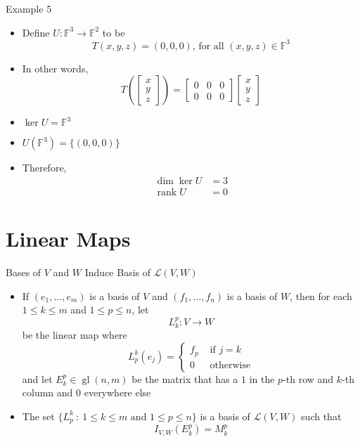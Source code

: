 \documentclass[usenames,dvipsnames,10pt]{beamer}
\newcommand\F{\mathbb{F}}
\newcommand{\gl}{\operatorname{gl}}
\renewcommand{\L}{\mathcal{L}}
\newcommand\rank{\operatorname{rank}}
\begin{document}
\begin{frame}
  {Example 5}
  \begin{itemize}
  \item Define $U: \F^3 \rightarrow \F^2$ to be
    \[
      T(x,y,z) = (0,0,0)\text{, for all }(x,y,z) \in \F^3
    \]
  \item In other words,
    \[
      T\left(\begin{bmatrix} x \\ y \\ z\end{bmatrix}\right)
      =
      \begin{bmatrix} 0 & 0 & 0\\ 0 & 0 & 0 \end{bmatrix}\begin{bmatrix} x \\ y \\ z\end{bmatrix}
    \]
  \item $\ker U = \F^3$
  \item $U(\F^3) = \{ (0,0,0) \}$
  \item Therefore,
    \begin{align*}
      \dim \ker U &= 3\\
      \rank U &= 0
    \end{align*}
  \end{itemize}
\end{frame}

\section{Linear Maps}

\begin{frame}
  {Bases of $V$ and $W$ Induce Basis of $\L(V,W)$}

  \begin{itemize}
  \item If $(e_1, \dots, e_m)$ is a basis of $V$ and $(f_1, \dots, f_n)$ is a basis of $W$, then for each $1 \le k \le m$ and $1 \le p \le n$, let
    \[
      L_k^p: V \rightarrow W
    \]
    be the linear map where
    \[
      L^k_p(e_j) =
      \begin{cases}
        f_p&\text{ if }j = k\\
        0 &\text{ otherwise}
      \end{cases}
    \]
    and let $E^p_k \in \gl(n,m)$ be the matrix that has a $1$ in the $p$-th row and $k$-th column and $0$ everywhere else
  \item The set
    $\{ L^k_p\ :\ 1 \le k \le m\text{ and }1 \le p \le n \}$
    is a basis of $\L(V,W)$ such that
    \[
      I_{V,W}(E^p_k) = M^p_k
    \]
  \end{itemize}
\end{frame}
\end{document}
